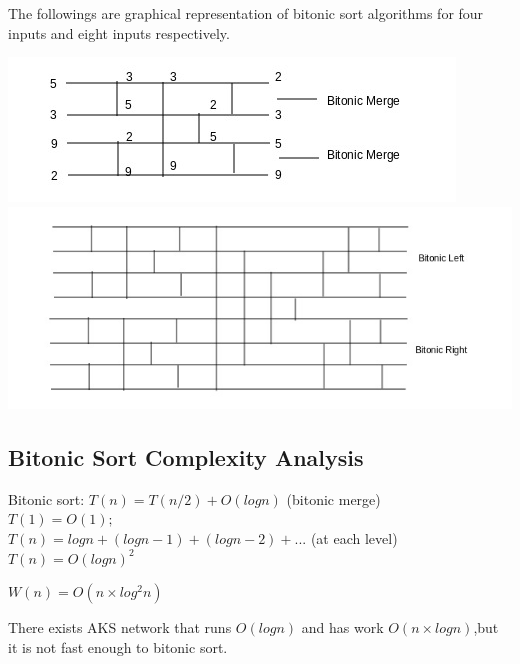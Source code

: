 \documentclass[twoside]{article}
\begin{document}
The followings are graphical representation of bitonic sort algorithms for four inputs and eight inputs respectively.

\begin{center}
\includegraphics[scale=0.5]{g7}\\
\includegraphics[scale=0.5]{g8}
\end{center}

\subsection{Bitonic Sort Complexity Analysis}

Bitonic sort: $T(n) = T(n/2) + O(logn)$ (bitonic merge)\\
$T(1)=O(1);$\\
$T(n)=logn + (logn - 1) + (logn - 2) + ... $ (at each level)\\
$T(n)=O(logn)^2$

$W(n) = O(n \times log^2n)$

There exists AKS network that runs $O(logn)$ and has work $O(n\times logn)$,but it is not fast enough to bitonic sort. 
\end{document}
